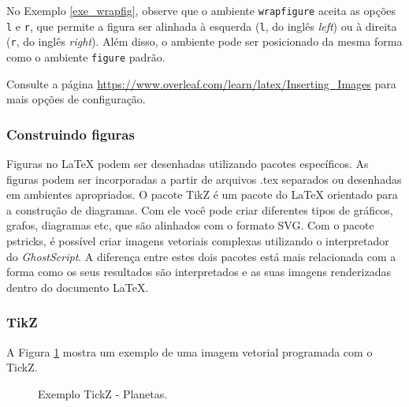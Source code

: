 No Exemplo \ref{exe_wrapfig}, observe que o ambiente {\tt wrapfigure} aceita as opções {\tt l} e {\tt r}, que permite a figura ser alinhada à esquerda ({\tt l}, do inglês \textit{left}) ou à direita ({\tt r}, do inglês \textit{right}). Além disso, o ambiente pode ser posicionado da mesma forma como o ambiente {\tt figure} padrão.

\begin{marker}
  Consulte a página \url{https://www.overleaf.com/learn/latex/Inserting_Images} para mais opções de configuração.
\end{marker}

\subsubsection*{Construindo figuras}
\label{sec:const_figs}


Figuras no LaTeX podem ser desenhadas utilizando pacotes específicos. As figuras podem ser incorporadas a partir de arquivos .tex separados ou desenhadas em ambientes apropriados. O pacote TikZ é um pacote do LaTeX orientado para a construção de diagramas. Com ele você pode criar diferentes tipos de gráficos, grafos, diagramas etc, que são alinhados com o formato SVG. Com o pacote pstricks, é possível criar imagens vetoriais complexas utilizando o interpretador do \textit{GhostScript}. A diferença entre estes dois pacotes está mais relacionada com a forma como os seus resultados são interpretados e as suas imagens renderizadas dentro do documento LaTeX. %

\subsubsection*{TikZ}

A Figura \ref{fig:exe_tickz} mostra um exemplo de uma imagem vetorial programada com o TickZ.

\begin{figure}[H]
\label{fig:exe_tickz}
    \begin{center}
        \resizebox{0.9\textwidth}{!}{}
    \end{center}
\caption{Exemplo TickZ - Planetas.}
\end{figure}


